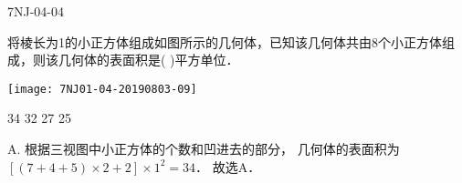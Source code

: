 \begin{defproblem}{7NJ-04-04}%
\begin{onlyproblem}%
将棱长为1的小正方体组成如图所示的几何体，已知该几何体共由8个小正方体组成，则该几何体的表面积是(    )平方单位． 
\begin{center}
\texttt{[image: 7NJ01-04-20190803-09]}
\end{center}

\xx
{34}
{32}
{27}
{25}

\end{onlyproblem}%
\begin{onlysolution}%
\begin{solution}%
A. 根据三视图中小正方体的个数和凹进去的部分， 几何体的表面积为$[(7+4+5) \times 2+2] \times 1^{2}=34$． 故选A． 
\end{solution}%
\end{onlysolution}%
\end{defproblem}






